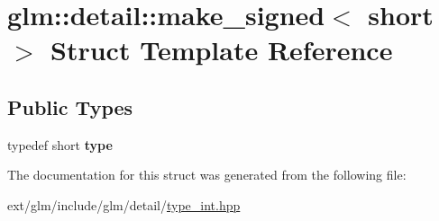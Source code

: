 \hypertarget{structglm_1_1detail_1_1make__signed_3_01short_01_4}{\section{glm\-:\-:detail\-:\-:make\-\_\-signed$<$ short $>$ Struct Template Reference}
\label{structglm_1_1detail_1_1make__signed_3_01short_01_4}
}
\subsection*{Public Types}
\begin{DoxyCompactItemize}
\item 
\hypertarget{structglm_1_1detail_1_1make__signed_3_01short_01_4_a9488d8ffbd34998675456fa6d1143989}{typedef short {\bfseries type}}\label{structglm_1_1detail_1_1make__signed_3_01short_01_4_a9488d8ffbd34998675456fa6d1143989}

\end{DoxyCompactItemize}


The documentation for this struct was generated from the following file\-:\begin{DoxyCompactItemize}
\item 
ext/glm/include/glm/detail/\hyperlink{type__int_8hpp}{type\-\_\-int.\-hpp}\end{DoxyCompactItemize}
